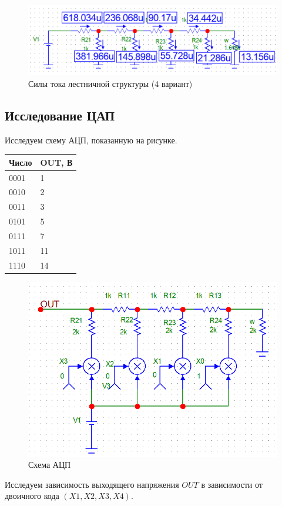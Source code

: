 \documentclass[a4paper, 12pt]{article} %
\begin{document}
\begin{figure}[h!]
    \centering
    \includegraphics[width = 12 cm]{11.png}
    \caption{Силы тока лестничной структуры (4 вариант)}
    \label{fig:vac}
\end{figure}


\subsection{Исследование ЦАП}

Исследуем схему АЦП, показанную на рисунке.

\begin{table}[h!]
\centering
\begin{tabular}{|l|l|}
\hline
Число & OUT, В \\ \hline
0001  & 1      \\ \hline
0010  & 2      \\ \hline
0011  & 3      \\ \hline
0101  & 5      \\ \hline
0111  & 7      \\ \hline
1011  & 11     \\ \hline
1110  & 14     \\ \hline
\end{tabular}
\end{table}

\begin{figure}[h!]
    \centering
    \includegraphics[width = 12 cm]{12.png}
    \caption{Схема АЦП}
    \label{fig:vac}
\end{figure}

Исследуем зависимость выходящего напряжения $OUT$ в зависимости от двоичного кода $(X1,X2,X3,X4)$.


















                    
\end{document}
